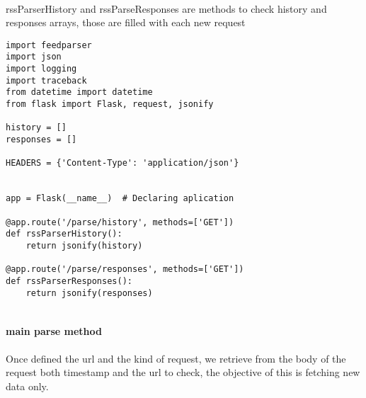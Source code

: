 \documentclass{article}
\begin{document}
\paragraph{}
rssParserHistory and rssParseResponses are methods to check history and responses arrays, those are filled with each new request
\begin{lstlisting}
import feedparser
import json
import logging
import traceback
from datetime import datetime
from flask import Flask, request, jsonify

history = []
responses = []

HEADERS = {'Content-Type': 'application/json'}


app = Flask(__name__)  # Declaring aplication

@app.route('/parse/history', methods=['GET'])
def rssParserHistory():
    return jsonify(history)

@app.route('/parse/responses', methods=['GET'])
def rssParserResponses():
    return jsonify(responses)


\end{lstlisting}

\paragraph{main parse method}
Once defined the url and the kind of request, we retrieve from the body of the request both timestamp and the url to check,
the objective of this is fetching new data only.
\end{document}
